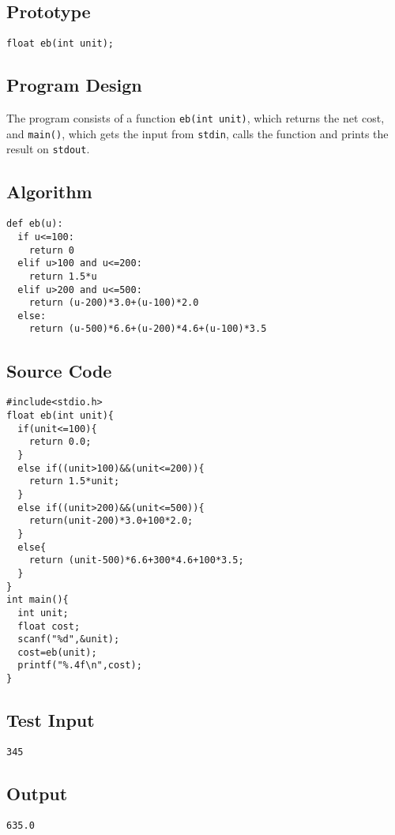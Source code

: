 \documentclass[11pt]{article}
\begin{document}
\subsection*{Prototype}
\label{sec-6-2}
\begin{verbatim}
float eb(int unit);
\end{verbatim}
\subsection*{Program Design}
\label{sec-6-3}
The program consists of a function \texttt{eb(int unit)}, which returns the net cost, and \texttt{main()},
which gets the input from \texttt{stdin}, calls the function and prints the result on \texttt{stdout}.
\subsection*{Algorithm}
\label{sec-6-4}
\begin{verbatim}
def eb(u):
  if u<=100:
    return 0
  elif u>100 and u<=200:
    return 1.5*u
  elif u>200 and u<=500:
    return (u-200)*3.0+(u-100)*2.0
  else:
    return (u-500)*6.6+(u-200)*4.6+(u-100)*3.5
\end{verbatim}
\subsection*{Source Code}
\label{sec-6-5}

\begin{verbatim}
#include<stdio.h>
float eb(int unit){
  if(unit<=100){
    return 0.0;
  }
  else if((unit>100)&&(unit<=200)){
    return 1.5*unit;
  }
  else if((unit>200)&&(unit<=500)){
    return(unit-200)*3.0+100*2.0;
  }
  else{
    return (unit-500)*6.6+300*4.6+100*3.5;
  }
}
int main(){
  int unit;
  float cost;
  scanf("%d",&unit);
  cost=eb(unit);
  printf("%.4f\n",cost);
}
\end{verbatim}

\subsection*{Test Input}
\label{sec-6-6}
\begin{verbatim}
345
\end{verbatim}
\subsection*{Output}
\label{sec-6-7}
\begin{verbatim}
635.0
\end{verbatim}
\end{document}

